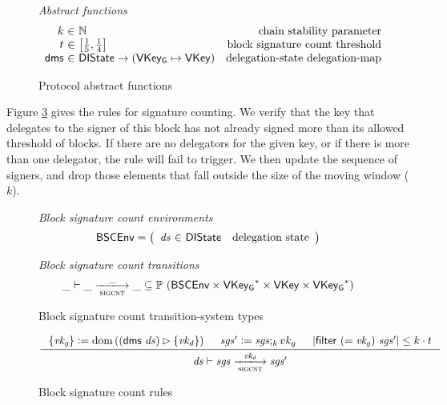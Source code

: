 \documentclass[11pt,a4paper]{article}
\DeclareMathOperator{\dom}{dom}
\newcommand{\powerset}[1]{\mathbb{P}~#1}
\newcommand{\restrictrange}{\rhd}
\newcommand{\var}[1]{\mathit{#1}}
\newcommand{\fun}[1]{\mathsf{#1}}
\newcommand{\type}[1]{\mathsf{#1}}
\newcommand{\size}[1]{\left| #1 \right|}
\newcommand{\trans}[2]{\xlongrightarrow[\textsc{#1}]{#2}}
\newcommand{\seqof}[1]{#1^{*}}
\newcommand{\leteq}{\ensuremath{\mathrel{\mathop:}=}}
\newcommand{\totalf}{\to}
\newcommand{\VKey}{\type{VKey}}
\newcommand{\VKeyGen}{\type{VKey_G}}
\newcommand{\DelegState}{\type{DIState}}
\begin{document}
\begin{figure}[ht]
  \emph{Abstract functions}
  \begin{equation*}
    \begin{array}{r@{~\in~}lr}
      k & \mathbb{N} & \text{chain stability parameter}\\
      t & \left[\frac{1}{5}, \frac{1}{4}\right] & \text{block signature count threshold}\\
      \fun{dms} & \DelegState \totalf (\VKeyGen \mapsto \VKey) & \text{delegation-state delegation-map}
    \end{array}
  \end{equation*}

  \caption{Protocol abstract functions}
  \label{fig:defs:proto-abstract-funcs}
\end{figure}


Figure \ref{fig:rules:sigcnt} gives the rules for signature counting. We verify
that the key that delegates to the signer of this block has not already signed
more than its allowed threshold of blocks. If there are no delegators for the
given key, or if there is more than one delegator, the rule will fail to trigger.
%
We then update the sequence of signers, and drop those elements that fall
outside the size of the moving window ($k$).

\begin{figure}[ht]
  \emph{Block signature count environments}
  \begin{equation*}
    \BSCEnv =
    \left(
      \begin{array}{r@{~\in~}lr}
        \var{ds} & \DelegState & \text{delegation state} \\
      \end{array}
    \right)
  \end{equation*}

  \emph{Block signature count transitions}
  \begin{equation*}
    \_ \vdash \var{\_} \trans{sigcnt}{\_} \var{\_} \subseteq
    \powerset (\BSCEnv \times \seqof{\VKeyGen} \times \VKey \times \seqof{\VKeyGen})
  \end{equation*}
  \caption{Block signature count transition-system types}
  \label{fig:ts-types:sigcnt}
\end{figure}

\begin{figure}[ht]
  \begin{equation*}
    \inference
    {
      \{\var{vk_g}\} \leteq \dom{((\fun{dms} ~ \var{ds}) \restrictrange \{\var{vk_d}\})}
      & \var{sgs'} \leteq \var{sgs};_k {vk_g} &
      \size{\fun{filter}~(=\var{vk_g})~\var{sgs'}} \leq k \cdot t \\
    }
    {
      \var{ds}
      \vdash
      {\var{sgs}}
      \trans{sigcnt}{\var{vk_d}}
      {\var{sgs'}}
    }
   \label{eq:rule:sigcnt}
 \end{equation*}
 \caption{Block signature count rules}
 \label{fig:rules:sigcnt}
\end{figure}
\end{document}
